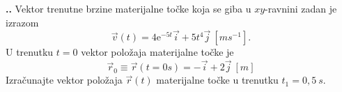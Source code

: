
\noindent 
\textbf{
\thecjelina.\thezadatak.}
Vektor trenutne brzine materijalne točke koja se giba u $xy$-ravnini zadan je izrazom
$$
\vec{v}(t)=4\mathrm{e}^{-5t}\vec{i}+5t^4\vec{j}   \ [ms^{-1}]. 
$$
U trenutku $t = 0$ vektor položaja materijalne točke je
$$
\vec{r}_0\equiv \vec{r}(t=0s)=-\vec{i}+2\vec{j}\ [m]
$$
Izračunajte vektor položaja $\vec{r}(t)$ materijalne točke u trenutku $t_1 = 0,5\ s$.
